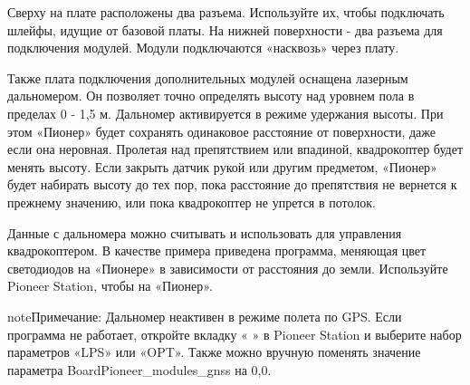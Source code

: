 \documentclass[a4paper,10pt,russian]{sphinxmanual}
\begin{document}
Сверху на плате расположены два разъема. Используйте их, чтобы подключать шлейфы, идущие от базовой платы. На нижней поверхности - два разъема для подключения модулей. Модули подключаются «насквозь» через плату.

Также плата подключения дополнительных модулей оснащена лазерным дальномером. Он позволяет точно определять высоту над уровнем пола в пределах  0 - 1,5 м. Дальномер активируется в режиме удержания высоты. При этом «Пионер» будет сохранять одинаковое расстояние от поверхности, даже если она неровная. Пролетая над препятствием или впадиной, квадрокоптер будет менять высоту. Если закрыть датчик рукой или другим предметом, «Пионер» будет набирать высоту до тех пор, пока расстояние до препятствия не вернется к прежнему значению, или пока квадрокоптер не упрется в потолок.

Данные с дальномера можно считывать и использовать для управления квадрокоптером. В качестве примера приведена программа, меняющая цвет светодиодов на «Пионере» в зависимости от расстояния до земли. Используйте Pioneer Station, чтобы   на «Пионер».

\begin{sphinxadmonition}{note}{Примечание:}
Дальномер неактивен в режиме полета по GPS. Если программа не работает, откройте вкладку « » в Pioneer Station и выберите набор параметров «LPS» или «OPT». Также можно вручную поменять значение параметра BoardPioneer\_modules\_gnss на 0,0.
\end{sphinxadmonition}
\end{document}
